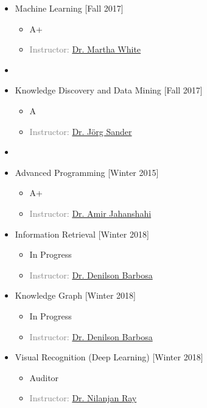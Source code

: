 \begin{multicols}{2}
\begin{itemize}
	\item {} Machine Learning \hfill[Fall 2017]
	\begin{itemize}
		\item A+
		\item \textcolor{gray}{Instructor: \href{http://webdocs.cs.ualberta.ca/~whitem/}{Dr. Martha White}}
	\end{itemize}
\item[]


	\item {} Knowledge Discovery and Data Mining \hfill[Fall 2017]
	\begin{itemize}
		\item A 
		\item \textcolor{gray}{Instructor: \href{http://webdocs.cs.ualberta.ca/~joerg/}{Dr. Jörg Sander}}
	\end{itemize}
\item[]
	
	\item {} Advanced Programming \hfill \hfill[Winter 2015]
	\begin{itemize}
		\item A+ 
		\item \textcolor{gray}{Instructor: \href{http://ee.aut.ac.ir/autcms/people/verticalPagesAjax/professorHomePage.htm?url=jahanshahi&depurl=electrical-engineering&lang=en&cid=50451496}{Dr. Amir Jahanshahi}}
		
	\end{itemize}

	\item {} Information Retrieval \hfill[Winter 2018]
	\begin{itemize}
		\item In Progress 
		\item \textcolor{gray}{Instructor: \href{https://sites.ualberta.ca/~denilson/}{Dr. Denilson Barbosa}}
	\end{itemize}

	\item {} Knowledge Graph \hfill[Winter 2018]
	\begin{itemize}
		\item In Progress 
		\item \textcolor{gray}{Instructor: \href{https://sites.ualberta.ca/~denilson/}{Dr. Denilson Barbosa}}
	\end{itemize}

	\item {} Visual Recognition  (Deep Learning) \hfill[Winter 2018]
	\begin{itemize}
		\item Auditor 
		\item \textcolor{gray}{Instructor: \href{https://webdocs.cs.ualberta.ca/~nray1/}{Dr. Nilanjan Ray}}
	\end{itemize}
	
\end{itemize}
\end{multicols}


